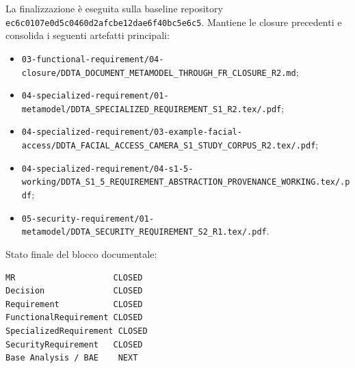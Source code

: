 \documentclass[12pt,a4paper,oneside]{report}
\newcommand{\artifact}[1]{\nolinkurl{#1}}
\begin{document}
La finalizzazione è eseguita sulla baseline repository \artifact{ec6c0107e0d5c0460d2afcbe12dae6f40bc5e6c5}. Mantiene le closure precedenti e consolida i seguenti artefatti principali:
\begin{itemize}
  \item \artifact{03-functional-requirement/04-closure/DDTA_DOCUMENT_METAMODEL_THROUGH_FR_CLOSURE_R2.md};
  \item \artifact{04-specialized-requirement/01-metamodel/DDTA_SPECIALIZED_REQUIREMENT_S1_R2.tex/.pdf};
  \item \artifact{04-specialized-requirement/03-example-facial-access/DDTA_FACIAL_ACCESS_CAMERA_S1_STUDY_CORPUS_R2.tex/.pdf};
  \item \artifact{04-specialized-requirement/04-s1-5-working/DDTA_S1_5_REQUIREMENT_ABSTRACTION_PROVENANCE_WORKING.tex/.pdf};
  \item \artifact{05-security-requirement/01-metamodel/DDTA_SECURITY_REQUIREMENT_S2_R1.tex/.pdf}.
\end{itemize}

Stato finale del blocco documentale:
\begin{lstlisting}
MR                    CLOSED
Decision              CLOSED
Requirement           CLOSED
FunctionalRequirement CLOSED
SpecializedRequirement CLOSED
SecurityRequirement   CLOSED
Base Analysis / BAE    NEXT
\end{lstlisting}
\end{document}
